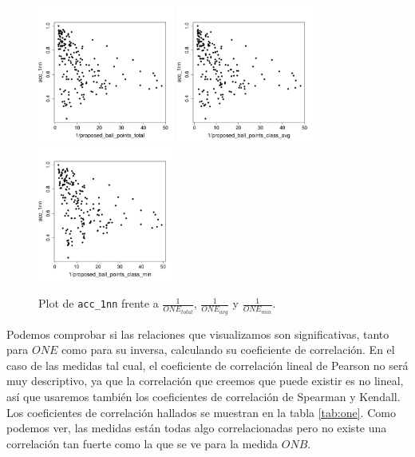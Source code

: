 \documentclass[a4paper,12pt]{report}
\theoremstyle{definition}
\begin{document}
\begin{figure}[H]
  \centering
  \includegraphics[width=0.4\textwidth]{plots/proposed/1nn_vs_inverted_proposed_ball_points_total}
  \includegraphics[width=0.4\textwidth]{plots/proposed/1nn_vs_inverted_proposed_ball_points_class_avg}
  \includegraphics[width=0.4\textwidth]{plots/proposed/1nn_vs_inverted_proposed_ball_points_class_min}
  \caption{Plot de \texttt{acc\_1nn} frente a $\frac{1}{ONE_{total}}$, $\frac{1}{ONE_{avg}}$ y $\frac{1}{ONE_{min}}$.}
  \label{fig:invone}
\end{figure}

Podemos comprobar si las relaciones que visualizamos son significativas, tanto para $ONE$ como para su inversa, calculando su coeficiente de correlación. En el caso de las medidas tal cual, el coeficiente de correlación lineal de Pearson no será muy descriptivo, ya que la correlación que creemos que puede existir es no lineal, así que usaremos también los coeficientes de correlación de Spearman y Kendall. Los coeficientes de correlación hallados se muestran en la tabla \ref{tab:one}. Como podemos ver, las medidas están todas algo correlacionadas pero no existe una correlación tan fuerte como la que se ve para la medida $ONB$.
\end{document}
